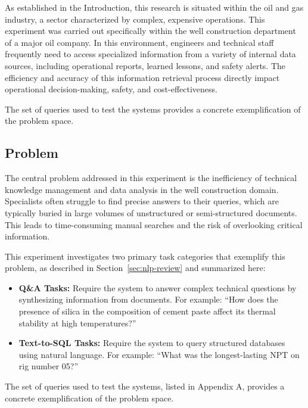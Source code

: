             As established in the Introduction, this research is situated within the oil and gas industry, a sector characterized by complex, expensive operations. This experiment was carried out specifically within the well construction department of a major oil company. In this environment, engineers and technical staff frequently need to access specialized information from a variety of internal data sources, including operational reports, learned lessons, and safety alerts. The efficiency and accuracy of this information retrieval process directly impact operational decision-making, safety, and cost-effectiveness.

            The set of queries used to test the systems
            provides a concrete exemplification of the problem space.

        \subsection{Problem}

            The central problem addressed in this experiment is the inefficiency of technical knowledge management and data analysis in the well construction domain. Specialists often struggle to find precise answers to their queries, which are typically buried in large volumes of unstructured or semi-structured documents. This leads to time-consuming manual searches and the risk of overlooking critical information.

            This experiment investigates two primary task categories that exemplify this problem, as described in Section~\ref{sec:nlp-review} and summarized here:
            
            \begin{itemize}
                \item \textbf{Q\&A Tasks:} Require the system to answer complex technical questions by synthesizing information from documents. For example: ``How does the presence of silica in the composition of cement paste affect its thermal stability at high temperatures?''
                \item \textbf{Text-to-SQL Tasks:} Require the system to query structured databases using natural language. For example: ``What was the longest-lasting NPT on rig number 05?''
            \end{itemize}
            
            The set of queries used to test the systems, listed in Appendix A, provides a concrete exemplification of the problem space.

